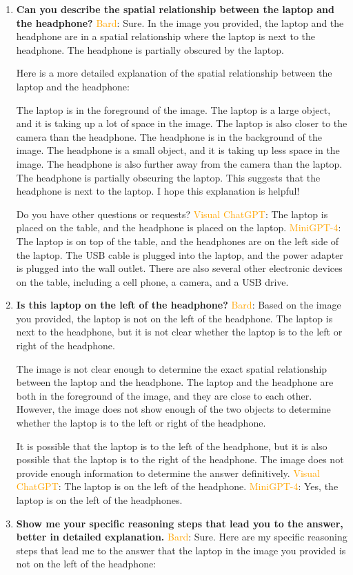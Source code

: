 \begin{enumerate}
    \item \textbf{Can you describe the spatial relationship between the laptop and the headphone?}
    \subitem \textcolor{orange}{Bard}: 
    Sure. In the image you provided, the laptop and the headphone are in a spatial relationship where the laptop is next to the headphone. The headphone is partially obscured by the laptop.

    Here is a more detailed explanation of the spatial relationship between the laptop and the headphone:

    The laptop is in the foreground of the image. The laptop is a large object, and it is taking up a lot of space in the image. The laptop is also closer to the camera than the headphone.
    The headphone is in the background of the image. The headphone is a small object, and it is taking up less space in the image. The headphone is also further away from the camera than the laptop.
    The headphone is partially obscuring the laptop. This suggests that the headphone is next to the laptop.
    I hope this explanation is helpful!

    Do you have other questions or requests?
    \subitem \textcolor{orange}{Visual ChatGPT}: The laptop is placed on the table, and the headphone is placed on the laptop.
    \subitem \textcolor{orange}{MiniGPT-4}: The laptop is on top of the table, and the headphones are on the left side of the laptop. The USB cable is plugged into the laptop, and the power adapter is plugged into the wall outlet. There are also several other electronic devices on the table, including a cell phone, a camera, and a USB drive.
    \item \textbf{Is this laptop on the left of the headphone?}
    \subitem \textcolor{orange}{Bard}: 
    Based on the image you provided, the laptop is not on the left of the headphone. The laptop is next to the headphone, but it is not clear whether the laptop is to the left or right of the headphone.
    
    The image is not clear enough to determine the exact spatial relationship between the laptop and the headphone. The laptop and the headphone are both in the foreground of the image, and they are close to each other. However, the image does not show enough of the two objects to determine whether the laptop is to the left or right of the headphone.
    
    It is possible that the laptop is to the left of the headphone, but it is also possible that the laptop is to the right of the headphone. The image does not provide enough information to determine the answer definitively.
    \subitem \textcolor{orange}{Visual ChatGPT}: The laptop is on the left of the headphone.
    \subitem \textcolor{orange}{MiniGPT-4}: Yes, the laptop is on the left of the headphones.
    \item \textbf{Show me your specific reasoning steps that lead you to the answer, better in detailed explanation.}
    \subitem \textcolor{orange}{Bard}: 
    Sure. Here are my specific reasoning steps that lead me to the answer that the laptop in the image you provided is not on the left of the headphone:
    

\end{enumerate}
